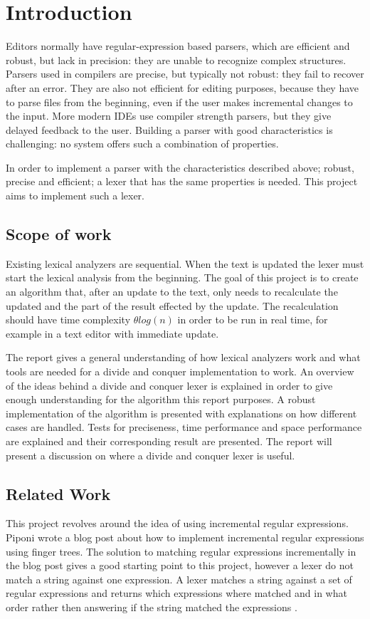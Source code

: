 \chapter{Introduction}
Editors normally have regular-expression based parsers, which are efficient and
robust, but lack in precision: they are unable to recognize complex structures.
Parsers used in compilers are precise, but typically not robust: they fail to
recover after an error. They are also not efficient for editing purposes,
because they have to parse files from the beginning, even if the user makes
incremental changes to the input. More modern IDEs use compiler strength
parsers, but they give delayed feedback to the user. Building a parser with good
characteristics is challenging: no system offers such a combination of
properties.

In order to implement a parser with the characteristics described above; robust,
precise and efficient; a lexer that has the same properties is needed. This
project aims to implement such a lexer.

\section{Scope of work}
Existing lexical analyzers are sequential. When the text is updated the lexer
must start the lexical analysis from the beginning. The goal of this project is
to create an algorithm that, after an update to the text, only needs to
recalculate the updated and the part of the result effected by the update. The
recalculation should have time complexity $\theta log(n)$ in order to be run in
real time, for example in a text editor with immediate update.

The report gives a general understanding of how lexical analyzers work and what
tools are needed for a divide and conquer implementation to work. An overview of
the ideas behind a divide and conquer lexer is explained in order to give enough
understanding for the algorithm this report purposes. A robust implementation of
the algorithm is presented with explanations on how different cases are handled.
Tests for preciseness, time performance and space performance are explained and
their corresponding result are presented. The report will present a discussion
on where a divide and conquer lexer is useful.

\section{Related Work}
This project revolves around the idea of using incremental regular expressions.
Piponi \cite{blog} wrote a blog post about how to implement incremental regular
expressions using finger trees. The solution to matching regular expressions
incrementally in the blog post gives a good starting point to this project,
however a lexer do not match a string against one expression. A lexer matches a
string against a set of regular expressions and returns which expressions where
matched and in what order rather then answering if the string matched the
expressions \cite{blog}.


